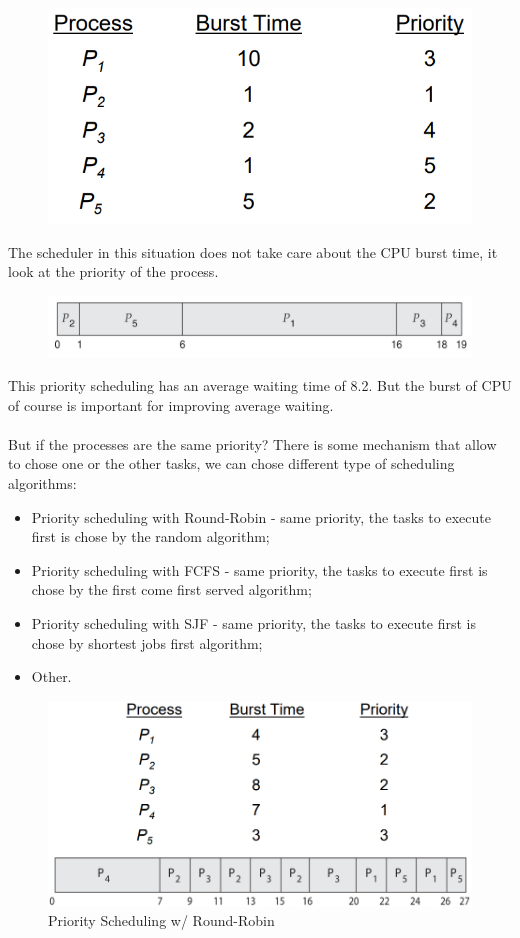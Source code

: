 \begin{figure}[htbp]
    \centering
    \includegraphics[width=0.4\linewidth]{img/priority_sched.png}  
\end{figure}

The scheduler in this situation does not take care about the CPU burst time, it look at the priority of the process.

\begin{figure}[htbp]
    \centering
    \includegraphics[width=0.65\linewidth]{img/gantt.png}
\end{figure}

This priority scheduling has an average waiting time of 8.2. But the burst of CPU of course is important for improving average waiting.
\paragraph{}

But if the processes are the same priority? There is some mechanism that allow to chose one or the other tasks, we can chose different type of scheduling algorithms:

\begin{itemize}
    \item Priority scheduling with Round-Robin - same priority, the tasks to execute first is chose by the random algorithm;
    \item Priority scheduling with FCFS - same priority, the tasks to execute first is chose by the first come first served algorithm;
    \item Priority scheduling with SJF - same priority, the tasks to execute first is chose by shortest jobs first algorithm;
    \item Other.
\end{itemize}

\begin{figure}[htbp]
    \centering
    \includegraphics[width=0.5\linewidth]{img/PSWRR.png}
    \caption{Priority Scheduling w/ Round-Robin}    
\end{figure}


